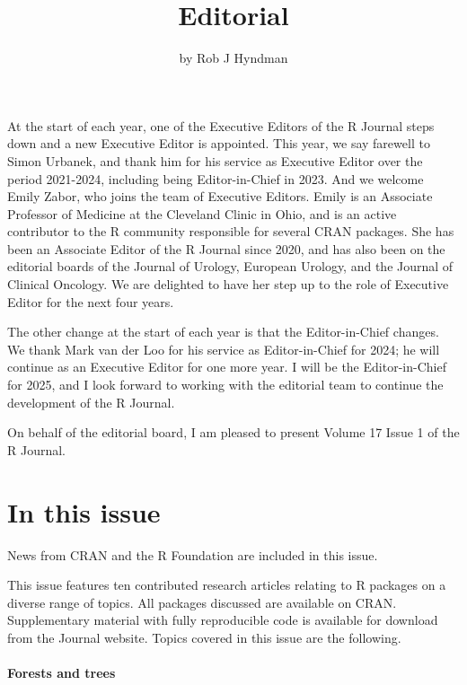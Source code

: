 \title{Editorial}


\author{by Rob J Hyndman}

\maketitle


At the start of each year, one of the Executive Editors of the R Journal steps down and a new Executive Editor is appointed. This year, we say farewell to Simon Urbanek, and thank him for his service as Executive Editor over the period 2021-2024, including being Editor-in-Chief in 2023. And we welcome Emily Zabor, who joins the team of Executive Editors. Emily is an Associate Professor of Medicine at the Cleveland Clinic in Ohio, and is an active contributor to the R community responsible for several CRAN packages. She has been an Associate Editor of the R Journal since 2020, and has also been on the editorial boards of the Journal of Urology, European Urology, and the Journal of Clinical Oncology.
We are delighted to have her step up to the role of Executive Editor for the next four years.

The other change at the start of each year is that the Editor-in-Chief changes. We thank Mark van der Loo for his service as Editor-in-Chief for 2024; he will continue as an Executive Editor for one more year. I will be the Editor-in-Chief for 2025, and I look forward to working with the editorial team to continue the development of the R Journal.

On behalf of the editorial board, I am pleased to present Volume 17 Issue 1 of the R Journal.

\section*{In this issue}\label{in-this-issue}

News from CRAN and the R Foundation are included in this issue.

This issue features ten contributed research articles relating to R
packages on a diverse range of topics. All packages discussed are available on CRAN.
Supplementary material with fully reproducible code is available for download
from the Journal website. Topics covered in this issue are the following.

\paragraph{Forests and trees}\label{forests-and-trees}

